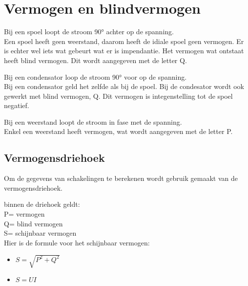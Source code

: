 \chapter{Vermogen en blindvermogen}
\label{vermogen}

Bij een spoel loopt de stroom 90° achter op de spanning.\\
Een spoel heeft geen weerstand, daarom heeft de idiale spoel geen vermogen. Er is echter wel iets wat gebeurt wat er is impendantie. Het
vermogen wat ontstaat heeft blind vermogen. Dit wordt aangegeven met de letter Q. 

Bij een condensator loop de stroom 90° voor op de spanning.\\
Bij een condensator geld het zelfde als bij de spoel. Bij de condesator wordt ook gewerkt met blind vermogen, Q. Dit vermogen is integenstelling
tot de spoel negatief.

Bij een weerstand loopt de stroom in fase met de spanning.\\
Enkel een weerstand heeft vermogen, wat wordt aangegeven met de letter P.

\section{Vermogensdriehoek}
Om de gegevens van schakelingen te berekenen wordt gebruik gemaakt van de vermogensdriehoek.

\begin{center}

\end{center}

binnen de driehoek geldt:\\
P= vermogen\\
Q= blind vermogen\\
S= schijnbaar vermogen\\

Hier is de formule voor het schijnbaar vermogen:
\begin{itemize}
    \item $S=\sqrt{P^2+Q^2}$
    \item $S= UI$
\end{itemize}

